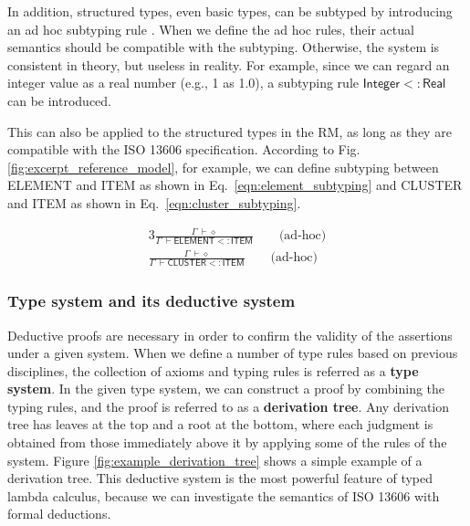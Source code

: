 \documentclass[preprint,3p,onecolumn,times,review]{elsarticle}
\begin{document}
In addition, structured types, even basic types, can be subtyped by introducing an ad hoc subtyping rule \cite[p.28]{cardelli04:_type_system}.
When we define the ad hoc rules, their actual semantics should be compatible with the subtyping. Otherwise, the system is consistent in theory, but useless in reality.
For example, since we can regard an integer value as a real number (e.g., 1 as 1.0), a subtyping rule $\mathsf{Integer} <: \mathsf{Real}$ can be introduced.

This can also be applied to the structured types in the RM, as long as they are compatible with the ISO 13606 specification. According to Fig. \ref{fig:excerpt_reference_model}, for example, we can define subtyping between {\sf ELEMENT} and {\sf ITEM} as shown in Eq.~\ref{eqn:element_subtyping} and {\sf CLUSTER} and {\sf ITEM} as shown in Eq.~\ref{eqn:cluster_subtyping}.

\begin{alignat}{3}
  \frac{\Gamma~ \vdash \diamond}
       {\Gamma~ \vdash \mathsf{ELEMENT} <: \mathsf{ITEM}} \qquad \text{(ad-hoc)} \label{eqn:element_subtyping} \\[6pt]
  \frac{\Gamma~ \vdash \diamond}
       {\Gamma~ \vdash \mathsf{CLUSTER} <: \mathsf{ITEM}} \qquad \text{(ad-hoc)} \label{eqn:cluster_subtyping}
\end{alignat}



\subsubsection{Type system and its deductive system}

Deductive proofs are necessary in order to confirm the validity of the assertions under a given system.
When we define a number of type rules based on previous disciplines, the collection of axioms and typing rules is referred as a {\bf type system}.
In the given type system, we can construct a proof by combining the typing rules, and the proof is referred to as a {\bf derivation tree}.
Any derivation tree has leaves at the top and a root at the bottom, where each judgment is obtained from those immediately above it by applying some of the rules of the system.
Figure \ref{fig:example_derivation_tree} shows a simple example of a derivation tree. 
This deductive system is the most powerful feature of typed lambda calculus, because we can investigate the semantics of ISO 13606 with formal deductions. 
\end{document}
